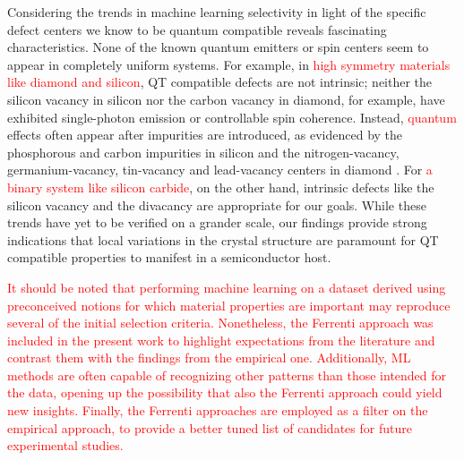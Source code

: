 \documentclass[superscriptaddress,unsortedaddress,
 amsmath,amssymb,
 aps,
]{revtex4-2}
\newcommand{\mrk}[1]{\textcolor{red}{#1}}
\begin{document}
Considering the trends in machine learning selectivity in light of the specific defect centers we know to be quantum compatible reveals fascinating characteristics. None of the known quantum emitters or spin centers seem to appear in completely uniform systems. For example, in \mrk{high symmetry materials like diamond and silicon}, QT compatible defects are not intrinsic; neither the silicon vacancy in silicon nor the carbon vacancy in diamond, for example,  have exhibited single-photon emission or controllable spin coherence. Instead, \mrk{quantum} effects often appear after impurities are introduced, as evidenced by the phosphorous and carbon impurities in silicon \cite{He2019,Redjem2020} and the nitrogen-vacancy, germanium-vacancy, tin-vacancy and lead-vacancy centers in diamond \cite{Thiering2020}. 
For \mrk{a binary system like silicon carbide}, on the other hand, intrinsic defects like the silicon vacancy and the divacancy are appropriate for our goals. 
While these trends have yet to be verified on a grander scale, our findings provide strong indications that local variations in the crystal structure are paramount for QT compatible properties to manifest in a semiconductor host. 

\mrk{It should be noted that performing machine learning on a dataset derived using preconceived notions for which material properties are important may reproduce several of the initial selection criteria. Nonetheless, the Ferrenti approach was included in the present work to highlight expectations from the literature and contrast them with the findings from the empirical one. Additionally, ML methods are often capable of recognizing other patterns than those intended for the data, opening up the possibility that also the Ferrenti approach could yield new insights. Finally, the Ferrenti approaches are employed as a filter on the empirical approach, to provide a better tuned list of candidates for future experimental studies.} 
\end{document}
